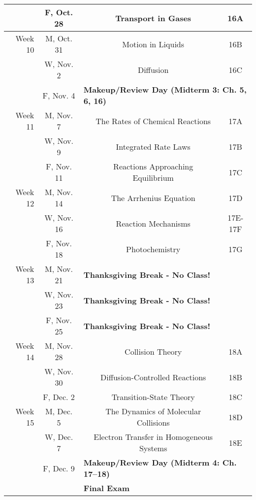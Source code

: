 \begin{tabular}{rcccc}
& F, Oct. 28&& Transport in Gases & 16A\\
\midrule
Week 10 & M, Oct. 31&& Motion in Liquids & 16B\\
& W, Nov. 2&& Diffusion & 16C\\
& F, Nov. 4& \multicolumn{3}{l}{\textbf{Makeup/Review Day (Midterm 3: Ch. 5, 6, 16)}}\\
\midrule
Week 11 & M, Nov. 7&& The Rates of Chemical Reactions & 17A\\
& W, Nov. 9&& Integrated Rate Laws & 17B\\
& F, Nov. 11&& Reactions Approaching Equilibrium & 17C\\
\midrule
Week 12 & M, Nov. 14&& The Arrhenius Equation & 17D\\
& W, Nov. 16&& Reaction Mechanisms & 17E-17F\\
& F, Nov. 18&& Photochemistry & 17G\\
\midrule
Week 13 & M, Nov. 21& \multicolumn{3}{l}{\textbf{Thanksgiving Break - No Class!}}\\
& W, Nov. 23& \multicolumn{3}{l}{\textbf{Thanksgiving Break - No Class!}}\\
& F, Nov. 25& \multicolumn{3}{l}{\textbf{Thanksgiving Break - No Class!}}\\
\midrule
Week 14 & M, Nov. 28&& Collision Theory & 18A\\
& W, Nov. 30&& Diffusion-Controlled Reactions & 18B\\
& F, Dec. 2&& Transition-State Theory & 18C\\
\midrule
Week 15 & M, Dec. 5&& The Dynamics of Molecular Collisions & 18D\\
& W, Dec. 7&& Electron Transfer in Homogeneous Systems & 18E\\
& F, Dec. 9& \multicolumn{3}{l}{\textbf{Makeup/Review Day (Midterm 4: Ch. 17--18)}}\\
\midrule
\midrule
& & \multicolumn{3}{l}{\textbf{Final Exam}}\\
\end{tabular}